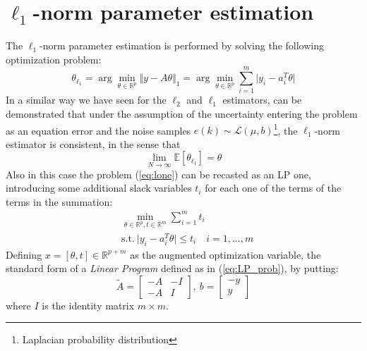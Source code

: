 \section{$\ell_1$-norm parameter estimation}
The $\ell_1$-norm parameter estimation is performed by solving the following optimization problem: 
{\large{
    \color{red}
    \begin{equation}\label{eq:lone}
        \theta_{\ell_1} = \arg\min_{\theta\in\mathbb{R}^p} \Vert y-A\theta \Vert_1 = \arg \min_{\theta\in\mathbb{R}^p} \sum_{i=1}^m \vert y_i-a_i^T\theta \vert 
    \end{equation}
}}
In a similar way we have seen for the $\ell_2$ and $\ell_1$ estimators, can be demonstrated that under the assumption of the uncertainty entering the problem as an equation error and the noise samples $e(k)\sim\mathcal{L}(\mu,b)$\footnote{
    Laplacian probability distribution
}, the $\ell_1$-norm estimator is consistent, in the sense that
\begin{equation}
    \lim_{N\to\infty} \mathbb{E}[\theta_{\ell_1}]=\theta
\end{equation}
Also in this case the problem (\ref{eq:lone}) can be recasted as an LP one, introducing some additional slack variables $t_i$ for each one of the terms of the terms in the summation:
\begin{equation}
    \begin{aligned}
        &\min_{\theta\in\mathbb{R}^p,t\in\mathbb{R}^m} \sum_{i=1}^m t_i\\
        &\text{s.t.} \ 
        \vert y_i-a_i^T\theta \vert \le t_i  \quad i=1,..., m
    \end{aligned}
\end{equation}
Defining $x=[\theta,t]\in\mathbb{R}^{p+m}$ as the augmented optimization variable, the standard form of a \textit{Linear Program} defined as in (\ref{eq:LP_prob}), by putting:
\begin{equation}
    \tilde{A}=\begin{bmatrix}
        -A&-I\\
        -A&I
    \end{bmatrix}, \ b=\begin{bmatrix}
        -y\\
        y
    \end{bmatrix}
\end{equation}
where $I$ is the identity matrix $m\times{m}$.

